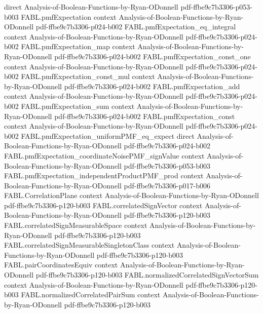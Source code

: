 \begin{theorem}
  {direct}
  {Analysis-of-Boolean-Functions-by-Ryan-ODonnell}
  {pdf-ffbe9c7b3306-p053-b003}
\proofstep
  {FABL.pmfExpectation}
  {context}
  {Analysis-of-Boolean-Functions-by-Ryan-ODonnell}
  {pdf-ffbe9c7b3306-p024-b002}
\proofstep
  {FABL.pmfExpectation_eq_integral}
  {context}
  {Analysis-of-Boolean-Functions-by-Ryan-ODonnell}
  {pdf-ffbe9c7b3306-p024-b002}
\proofstep
  {FABL.pmfExpectation_map}
  {context}
  {Analysis-of-Boolean-Functions-by-Ryan-ODonnell}
  {pdf-ffbe9c7b3306-p024-b002}
\proofstep
  {FABL.pmfExpectation_const_one}
  {context}
  {Analysis-of-Boolean-Functions-by-Ryan-ODonnell}
  {pdf-ffbe9c7b3306-p024-b002}
\proofstep
  {FABL.pmfExpectation_const_mul}
  {context}
  {Analysis-of-Boolean-Functions-by-Ryan-ODonnell}
  {pdf-ffbe9c7b3306-p024-b002}
\proofstep
  {FABL.pmfExpectation_add}
  {context}
  {Analysis-of-Boolean-Functions-by-Ryan-ODonnell}
  {pdf-ffbe9c7b3306-p024-b002}
\proofstep
  {FABL.pmfExpectation_sum}
  {context}
  {Analysis-of-Boolean-Functions-by-Ryan-ODonnell}
  {pdf-ffbe9c7b3306-p024-b002}
\proofstep
  {FABL.pmfExpectation_const}
  {context}
  {Analysis-of-Boolean-Functions-by-Ryan-ODonnell}
  {pdf-ffbe9c7b3306-p024-b002}
\proofstep
  {FABL.pmfExpectation_uniformPMF_eq_expect}
  {direct}
  {Analysis-of-Boolean-Functions-by-Ryan-ODonnell}
  {pdf-ffbe9c7b3306-p024-b002}
\proofstep
  {FABL.pmfExpectation_coordinateNoisePMF_signValue}
  {context}
  {Analysis-of-Boolean-Functions-by-Ryan-ODonnell}
  {pdf-ffbe9c7b3306-p053-b003}
\proofstep
  {FABL.pmfExpectation_independentProductPMF_prod}
  {context}
  {Analysis-of-Boolean-Functions-by-Ryan-ODonnell}
  {pdf-ffbe9c7b3306-p017-b006}
\proofstep
  {FABL.CorrelationPlane}
  {context}
  {Analysis-of-Boolean-Functions-by-Ryan-ODonnell}
  {pdf-ffbe9c7b3306-p120-b003}
\proofstep
  {FABL.correlatedSignVector}
  {context}
  {Analysis-of-Boolean-Functions-by-Ryan-ODonnell}
  {pdf-ffbe9c7b3306-p120-b003}
\proofstep
  {FABL.correlatedSignMeasurableSpace}
  {context}
  {Analysis-of-Boolean-Functions-by-Ryan-ODonnell}
  {pdf-ffbe9c7b3306-p120-b003}
\proofstep
  {FABL.correlatedSignMeasurableSingletonClass}
  {context}
  {Analysis-of-Boolean-Functions-by-Ryan-ODonnell}
  {pdf-ffbe9c7b3306-p120-b003}
\proofstep
  {FABL.pairCoordinatesEquiv}
  {context}
  {Analysis-of-Boolean-Functions-by-Ryan-ODonnell}
  {pdf-ffbe9c7b3306-p120-b003}
\proofstep
  {FABL.normalizedCorrelatedSignVectorSum}
  {context}
  {Analysis-of-Boolean-Functions-by-Ryan-ODonnell}
  {pdf-ffbe9c7b3306-p120-b003}
\proofstep
  {FABL.normalizedCorrelatedPairSum}
  {context}
  {Analysis-of-Boolean-Functions-by-Ryan-ODonnell}
  {pdf-ffbe9c7b3306-p120-b003}

\end{theorem}
